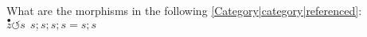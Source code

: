 
What are the morphisms in the following \ref{Category|category|referenced}: $\boxed{\overset{\bullet}{z}\circlearrowleft s\ \ \boxed{s;s;s;s = s;s}}$